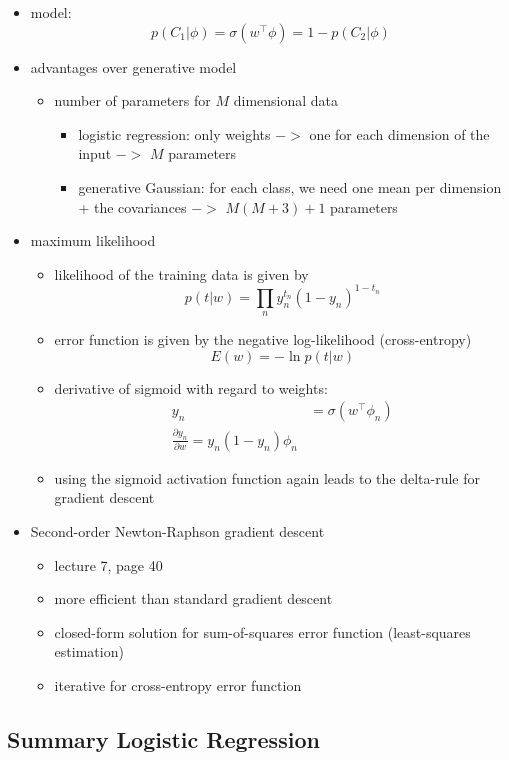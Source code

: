 \documentclass{article}
\begin{document}
\begin{itemize}
  \item model:
  \[
    p(C_1|\phi) = \sigma(w^\top \phi) = 1 - p(C_2|\phi)
  \]
  \item advantages over generative model
  \begin{itemize}
    \item number of parameters for $M$ dimensional data
    \begin{itemize}
      \item logistic regression: only weights $->$ one for each dimension of the input $->$ $M$ parameters
      \item generative Gaussian: for each class, we need one mean per dimension + the covariances $->$ $M(M+3)+1$ parameters
    \end{itemize}
  \end{itemize}
  \item maximum likelihood
  \begin{itemize}
    \item likelihood of the training data is given by
    \[
      p(t|w) = \prod_n y_n^{t_n}(1-y_n)^{1-t_n}
    \]
    \item error function is given by the negative log-likelihood (cross-entropy)
    \[
      E(w) = - \ln p(t|w)
    \]
    \item derivative of sigmoid with regard to weights:
    \begin{align*}
      y_n &= \sigma(w^\top \phi_n) \\
      \frac{\partial y_n}{\partial w} = y_n(1-y_n)\phi_n
    \end{align*}
    \item using the sigmoid activation function again leads to the delta-rule for gradient descent
  \end{itemize}
  \item Second-order Newton-Raphson gradient descent
  \begin{itemize}
    \item lecture 7, page 40
    \item more efficient than standard gradient descent
    \item closed-form solution for sum-of-squares error function (least-squares estimation)
    \item iterative for cross-entropy error function
  \end{itemize}
\end{itemize}

\subsection{Summary Logistic Regression}
\end{document}
